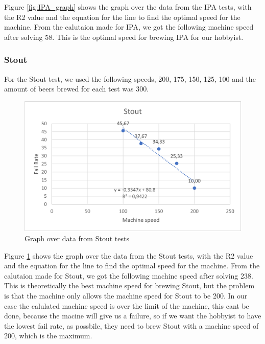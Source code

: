 Figure \ref{fig:IPA_graph} shows the graph over the data from the IPA tests, with the R2 value and the equation for the line to find the optimal speed for the machine. \newline
From the calutaion made for IPA, we got the following machine speed after solving 58. This is the optimal speed for brewing IPA for our hobbyist. \newline

\subsubsection{Stout}
For the Stout test, we used the following speeds, 200, 175, 150, 125, 100 and the amount of beers brewed for each test was 300.

\begin{center}
    \centering
    \begin{figure}[H]
        \includegraphics[width=1\textwidth]{img/Stout_graph.png}
        \caption{Graph over data from Stout tests}
        \label{fig:Stout_graph}
    \end{figure}
\end{center}

Figure \ref{fig:Stout_graph} shows the graph over the data from the Stout tests, with the R2 value and the equation for the line to find the optimal speed for the machine. \newline
From the calutaion made for Stout, we got the following machine speed after solving 238. This is theoretically the best machine speed for brewing Stout, but the problem is that the machine only allows the machine speed for Stout to be 200.
In our case the calulated machine speed is over the limit of the machine, this cant be done, because the macine will give us a failure, so if we want the hobbyist to have the lowest fail rate, as possbile, they need to brew Stout with a machine speed of 200, which is the maximum. \newline

